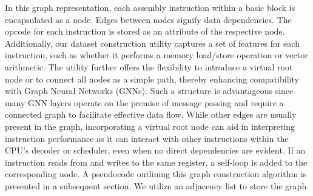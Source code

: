 In this graph representation, each assembly instruction within a basic block is encapsulated as a node. Edges between nodes signify data dependencies. The opcode for each instruction is stored as an attribute of the respective node. Additionally, our dataset construction utility captures a set of features for each instruction, such as whether it performs a memory load/store operation or vector arithmetic. The utility further offers the flexibility to introduce a virtual root node or to connect all nodes as a simple path, thereby enhancing compatibility with Graph Neural Networks (GNNs). Such a structure is advantageous since many GNN layers operate on the premise of message passing and require a connected graph to facilitate effective data flow. While other edges are usually present in the graph, incorporating a virtual root node can aid in interpreting instruction performance as it can interact with other instructions within the CPU's decoder or scheduler, even when no direct dependencies are evident. If an instruction reads from and writes to the same register, a self-loop is added to the corresponding node. A pseudocode outlining this graph construction algorithm is presented in a subsequent section. We utilize an adjacency list to store the graph.

